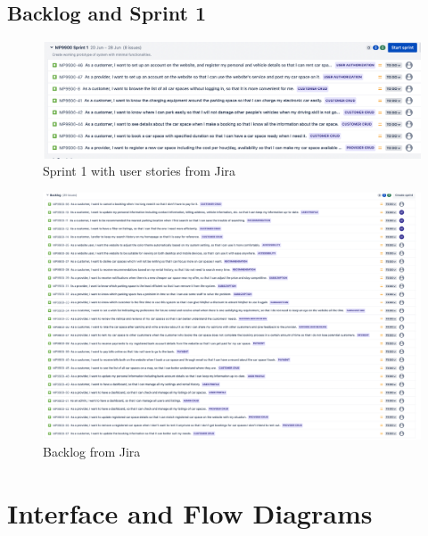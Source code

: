 \documentclass[12pt]{article}
\begin{document}
\subsection{Backlog and Sprint 1}
  \begin{figure}[htp]
    \centering
    \includegraphics[width=\textwidth]{sprint1.png}
  \caption{Sprint 1 with user stories from Jira}
  
  \end{figure}

  \begin{figure}[htp]
    \centering
    \includegraphics[width=\textwidth]{backlog.png}
  \caption{Backlog from Jira}
  \end{figure}

\section{Interface and Flow Diagrams}
\end{document}
